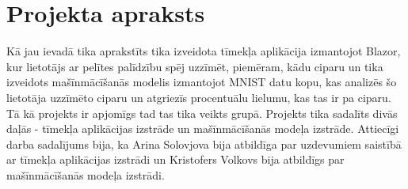 \section{Projekta apraksts}

    Kā jau ievadā tika aprakstīts tika izveidota tīmekļa aplikācija izmantojot Blazor, kur lietotājs
    ar pelītes palīdzību spēj uzzīmēt, piemēram, kādu ciparu un tika izveidots mašīnmācīšanās modelis
    izmantojot MNIST datu kopu, kas analizēs šo lietotāja uzzīmēto ciparu un atgriezīs procentuālu
    lielumu, kas tas ir pa ciparu. Tā kā projekts ir apjomīgs tad tas tika veikts grupā. Projekts tika
    sadalīts divās daļās - tīmekļa aplikācijas izstrāde un mašīnmācīšanās modeļa izstrāde. Attiecīgi
    darba sadalījums bija, ka Arina Solovjova bija atbildīga par uzdevumiem saistībā ar tīmekļa
    aplikācijas izstrādi un Kristofers Volkovs bija atbildīgs par mašīnmācīšanās modeļa izstrādi.

    

    
